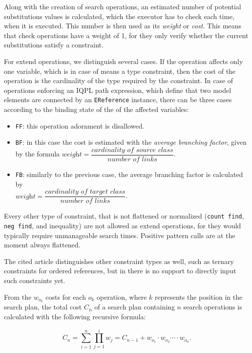 Along with the creation of search operations, an estimated number of potential substitutions values is calculated, which the executor has to check each time, when it is executed. This number is then used as its \emph{weight} or \emph{cost}. This means that check operations have a weight of 1, for they only verify whether the current substitutions satisfy a constraint. 

For extend operations, we distinguish several cases. If the operation affects only one variable, which is in case of \eiq means a type constraint, then the cost of the operation is the cardinality of the type required by the constraint. In case of operations enforcing an IQPL path expression, which define that two model elements are connected by an \texttt{EReference} instance, there can be three cases according to the binding state of the of the affected variables:

\begin{itemize}
	\item \texttt{FF}: this operation adornment is disallowed.
	\item \texttt{BF}: in this case the cost is estimated with the \emph{average branching factor}, given by the formula $\textit{weight} = \dfrac{\textit{cardinality of source class}}{\textit{number of links}}$.
	\item \texttt{FB}: similarly to the previous case, the average branching factor is calculated by \\$\textit{weight} = \dfrac{\textit{cardinality of target class}}{\textit{number of links}}$.
\end{itemize}

Every other type of constraint, that is not flattened or normalized (\texttt{count find}, \texttt{neg find}, and inequality) are not allowed as extend operations, for they would typically require unmanageable search times. Positive pattern calls are at the moment always flattened.

The cited article distinguishes other constraint types as well, such as ternary constraints for ordered references, but in \eiq there is no support to directly input such constraints yet.

From the $w_{o_{k}}$ costs for each $o_k$ operation, where $k$ represents the position in the search plan, the total cost $C_n$ of a search plan containing $n$ search operations is calculated with the following recursive formula:

$$ C_n = \sum_{i=1}^{n} \prod_{j=1}^{i} w_j = C_{n-1} + w_{o_{1}} \cdot w_{o_{2}} \cdots \cdot w_{o_{n}}. $$
\label{sec:cost}

